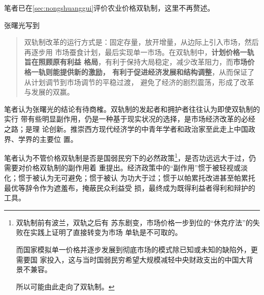 笔者已在\cref{sec:nongshuanggui}评价农业价格双轨制，这里不再赘述。

张曙光写到
\begin{quotation}
  双轨制改革的运行方式是：固定存量，放开增量，从边际上引入市场，然后再逐步用
  市场蚕食计划，最后实现单一市场。在双轨制中，\textbf{计划价格一轨旨在照顾原有利益
    格局}，有利于保持大局稳定，减少改革阻力，而\textbf{市场价格一轨则能提供新的激励，
    有利于促进经济发展和结构调整}，从而保证了从计划调节到市场调节的平稳过渡，
  避免了经济的剧烈震荡，形成了改革与发展的双赢。
\end{quotation}

笔者认为张曙光的结论有待商榷。双轨制的发起者和拥护者往往认为即使双轨制的实行
带有些明显副作用，仍是一种基于现实状况的选择，是市场经济改革的必经之路；是理
论创新。推崇西方现代经济学的中青年学者和政治家至此走上中国政界、学界的主要位
置。

笔者认为不管价格双轨制是否是国弱民穷下的必然政策\footnote{双轨制前有波兰，双轨之后有
  苏东剧变，市场价格一步到位的“休克疗法”的失败在实践上证明了直接转变为市场
  单轨是不可取的。

  而国家模拟单一价格并逐步发展到彻底市场的模式除已知或未知的缺陷外，更需要国
  家投入，这与当时国弱民穷希望大规模减轻中央财政支出的中国大背景不兼容。

  所以可能由此走向了双轨制。}，是否功远远大于过，仍需要对价格双轨制的副作用着
重提出。经济政策中的“副作用”惯于被轻视或淡化；惯于被认为无可避免；惯于被认
为功大于过；惯于以帕累托改进甚至帕累托最优等辞令作为遮羞布，掩蔽民众利益受
损，最终成为既得利益者得利和辩护的工具。

